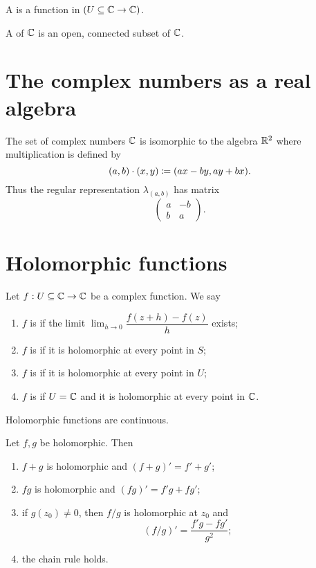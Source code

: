 \begin{definition}
A  is a function in $(U\subseteq \mathbb{C} \to \mathbb{C})$.

A  of $\mathbb{C}$ is an open, connected subset of $\mathbb{C}$.
\end{definition}
\section{The complex numbers as a real algebra}
The set of complex numbers $\mathbb{C}$ is isomorphic to the algebra $\mathbb{R}^2$ where multiplication is defined by
\[ (a, b)\cdot (x, y) \coloneqq (ax-by, ay+bx). \]
Thus the regular representation $\lambda_{(a,b)}$ has matrix
\[ \begin{pmatrix}
a & -b \\ b & a
\end{pmatrix}. \]

\section{Holomorphic functions}
\begin{definition}
Let $f:U\subseteq \mathbb{C} \to \mathbb{C}$ be a complex function. We say
\begin{enumerate}
\item $f$ is  if the limit $\lim_{h\to 0} \dfrac{f(z+h) - f(z)}{h}$
exists;
\item $f$ is  if it is holomorphic at every point in $S$;
\item $f$ is  if it is holomorphic at every point in $U$;
\item $f$ is  if $U=\mathbb{C}$ and it is holomorphic at every point in $\mathbb{C}$.
\end{enumerate}
\end{definition}

\begin{lemma}
Holomorphic functions are continuous.
\end{lemma}
\begin{lemma}
Let $f,g$ be holomorphic. Then
\begin{enumerate}
\item $f+g$ is holomorphic and $(f+g)' = f'+g'$;
\item $fg$ is holomorphic and $(fg)' = f'g+fg'$;
\item if $g(z_0)\neq 0$, then $f/g$ is holomorphic at $z_0$ and
\[ (f/g)' = \frac{f'g - fg'}{g^2}; \]
\item the chain rule holds.
\end{enumerate}
\end{lemma}

